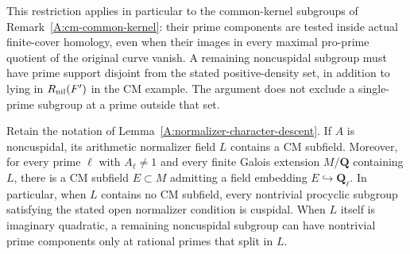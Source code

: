This restriction applies in particular to the common-kernel
subgroups of Remark~\ref{A:cm-common-kernel}: their prime
components are tested inside actual finite-cover homology,
even when their images in every maximal pro-prime quotient
of the original curve vanish. A remaining noncuspidal
subgroup must have prime support disjoint from the stated
positive-density set, in addition to lying in
$R_{\rm nil}(F')$ in the CM example. The argument does not
exclude a single-prime subgroup at a prime outside that set.

\begin{proposition}
\label{A:cm-normalizer-field}
Retain the notation of
Lemma~\ref{A:normalizer-character-descent}. If $A$ is
noncuspidal, its arithmetic normalizer field $L$
contains a CM subfield. Moreover, for every prime
$\ell$ with $A_\ell\ne1$ and every finite Galois
extension $M/\mathbf Q$ containing $L$, there is a
CM subfield $E\subset M$ admitting a field embedding
$E\hookrightarrow\mathbf Q_\ell$. In particular,
when $L$ contains no CM subfield, every nontrivial
procyclic subgroup satisfying the stated open
normalizer condition is cuspidal. When $L$ itself
is imaginary quadratic, a remaining noncuspidal
subgroup can have nontrivial prime components only
at rational primes that split in $L$.
\end{proposition}
